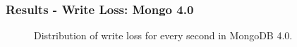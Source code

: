 \documentclass[numfooter,sectionpages,protectFrameTitle, progressbar, cblock, valigncolumns, addlogo]{beamer}
\begin{document}










\begin{frame}
    \frametitle{Results - Write Loss: Mongo 4.0}
    \centering
    \begin{figure}
        \scalebox{.5}{}
        \caption{Distribution of write loss for every second in MongoDB 4.0.}
    \end{figure}

\end{frame}
\end{document}
